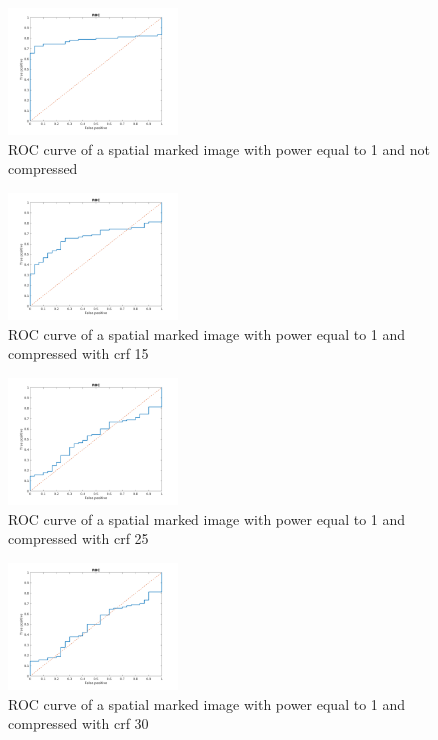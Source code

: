 \begin{figure}[h!]
\centering
\includegraphics[width=0.4\textwidth]{./img/ROC/ROC_gauss_1_1.png}
\caption{\small{ROC curve of a spatial marked image with power equal to 1 and not compressed}}
\label{fig:g1crf1}
\end{figure}
\begin{figure}[h!]
\centering
\includegraphics[width=0.4\textwidth]{./img/ROC/ROC_gauss_1_15.png}
\caption{\small{ROC curve of a spatial marked image with power equal to 1 and compressed with crf 15}}
\label{fig:g1crf15}
\end{figure}
\begin{figure}[h!]
\centering
\includegraphics[width=0.4\textwidth]{./img/ROC/ROC_gauss_1_25.png}
\caption{\small{ROC curve of a spatial marked image with power equal to 1 and compressed with crf 25}}
\label{fig:g1crf25}
\end{figure}
\begin{figure}[h!]
\centering
\includegraphics[width=0.4\textwidth]{./img/ROC/ROC_gauss_1_30.png}
\caption{\small{ROC curve of a spatial marked image with power equal to 1 and compressed with crf 30}}
\label{fig:g1crf30}
\end{figure}
